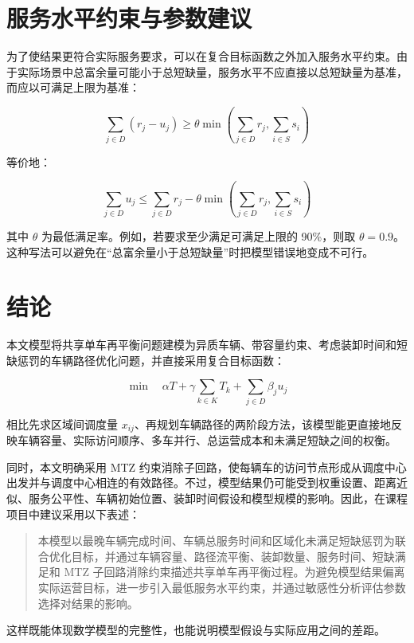 \documentclass[UTF8,a4paper,12pt]{ctexart}
\begin{document}
\section{服务水平约束与参数建议}

为了使结果更符合实际服务要求，可以在复合目标函数之外加入服务水平约束。由于实际场景中总富余量可能小于总短缺量，服务水平不应直接以总短缺量为基准，而应以可满足上限为基准：

\[
\sum_{j\in D}(r_j-u_j)\ge \theta \min\left(\sum_{j\in D}r_j,\sum_{i\in S}s_i\right)
\]

等价地：

\[
\sum_{j\in D}u_j
\le
\sum_{j\in D}r_j
-\theta \min\left(\sum_{j\in D}r_j,\sum_{i\in S}s_i\right)
\]

其中 \(\theta\) 为最低满足率。例如，若要求至少满足可满足上限的 90\%，则取 \(\theta=0.9\)。这种写法可以避免在“总富余量小于总短缺量”时把模型错误地变成不可行。

\section{结论}

本文模型将共享单车再平衡问题建模为异质车辆、带容量约束、考虑装卸时间和短缺惩罚的车辆路径优化问题，并直接采用复合目标函数：

\[
\min \quad
\alpha T+\gamma\sum_{k\in K}T_k+\sum_{j\in D}\beta_j u_j
\]

相比先求区域间调度量 \(x_{ij}\)、再规划车辆路径的两阶段方法，该模型能更直接地反映车辆容量、实际访问顺序、多车并行、总运营成本和未满足短缺之间的权衡。

同时，本文明确采用 MTZ 约束消除子回路，使每辆车的访问节点形成从调度中心出发并与调度中心相连的有效路径。不过，模型结果仍可能受到权重设置、距离近似、服务公平性、车辆初始位置、装卸时间假设和模型规模的影响。因此，在课程项目中建议采用以下表述：

\begin{quote}
本模型以最晚车辆完成时间、车辆总服务时间和区域化未满足短缺惩罚为联合优化目标，并通过车辆容量、路径流平衡、装卸数量、服务时间、短缺满足和 MTZ 子回路消除约束描述共享单车再平衡过程。为避免模型结果偏离实际运营目标，进一步引入最低服务水平约束，并通过敏感性分析评估参数选择对结果的影响。
\end{quote}

这样既能体现数学模型的完整性，也能说明模型假设与实际应用之间的差距。
\end{document}
